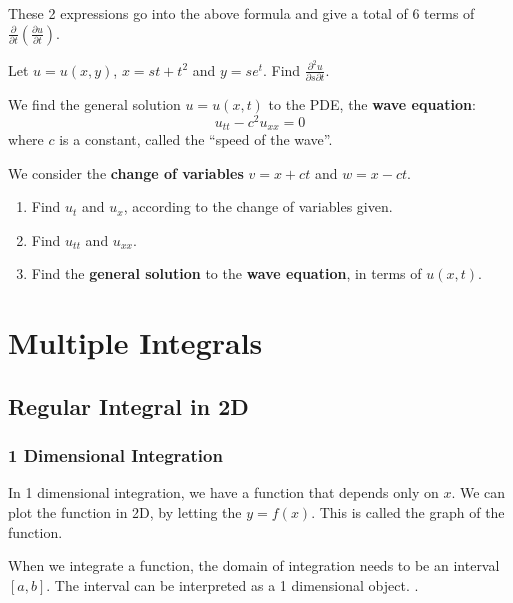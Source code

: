\documentclass[11pt,fleqn]{book} %
\begin{document}
These 2 expressions go into the above formula and give a total of 6 terms of $\frac{\partial}{\partial t} \left( \frac{\partial u}{\partial t} \right)$. 

\begin{exercise}
    Let $u = u(x, y)$, $x = st + t^2$ and $y = se^t$. Find $\frac{\partial^2 u}{\partial s \partial t}$. 
\end{exercise}

\begin{exercise}
    We find the general solution $u = u(x, t)$ to the PDE, the \textbf{wave equation}: $$u_{tt} - c^2u_{xx} = 0$$ where $c$ is a constant, called the ``speed of the wave''. 

    We consider the \textbf{change of variables} $v = x+ct$ and $w = x-ct$. 

    \begin{enumerate}
        \item Find $u_t$ and $u_x$, according to the change of variables given. 
        \item Find $u_{tt}$ and $u_{xx}$. 
        \item Find the \textbf{general solution} to the \textbf{wave equation}, in terms of $u(x, t)$.
    \end{enumerate}
\end{exercise}


\chapter{Multiple Integrals}

\section{Regular Integral in 2D}

\subsection*{1 Dimensional Integration}

In 1 dimensional integration, we have a function that depends only on $x$. We can plot the function in 2D, by letting the $y = f(x)$. This is called the graph of the function.

When we integrate a function, the domain of integration needs to be an interval $[a, b]$. The interval can be interpreted as a 1 dimensional object. .
\end{document}
